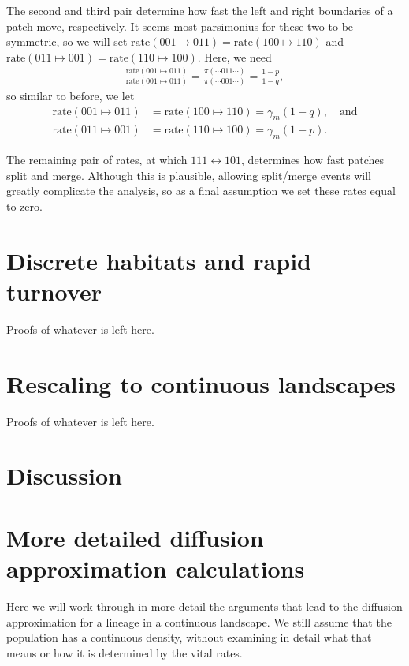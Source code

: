 \documentclass{article}
\newcommand{\rate}[2]{\text{rate}(#1\mapsto#2)}
\begin{document}
The second and third pair determine how fast the left and right boundaries of a patch move, respectively.
It seems most parsimonius for these two to be symmetric,
so we will set $\rate{001}{011} = \rate{100}{110}$ and $\rate{011}{001} = \rate{110}{100}$.
Here, we need
\begin{align*}
    \frac{\rate{001}{011}}{\rate{001}{011}}
    =
    \frac{\pi(\cdots011\cdots)}{\pi(\cdots001\cdots)}
    =
    \frac{1-p}{1-q} ,
\end{align*}
so similar to before, we let
\begin{align}
    \rate{001}{011} &= \rate{100}{110} = \gamma_m (1-q), \quad \text{and} \\
    \rate{011}{001} &= \rate{110}{100} = \gamma_m (1-p) .
\end{align}

The remaining pair of rates, at which $111 \leftrightarrow 101$,
determines how fast patches split and merge.
Although this is plausible, allowing split/merge events will greatly complicate the analysis,
so as a final assumption we set these rates equal to zero.




\section{Discrete habitats and rapid turnover}

Proofs of whatever is left here.


\section{Rescaling to continuous landscapes}

Proofs of whatever is left here.


\section{Discussion}



\appendix


\section{More detailed diffusion approximation calculations}

Here we will work through in more detail the arguments that lead to the diffusion approximation
for a lineage in a continuous landscape.
We still assume that the population has a continuous density,
without examining in detail what that means or how it is determined by the vital rates.
\end{document}
